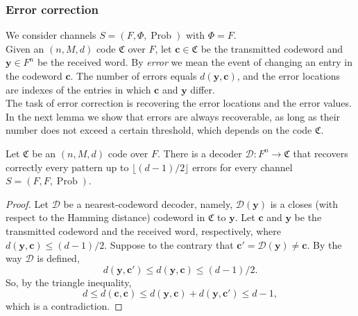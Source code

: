 \subsubsection{Error correction}
We consider channels $S=(F,\Phi,\operatorname{Prob})$ with $\Phi = F$.\\
\indent Given an $(n,M,d)$ code $\mathfrak{C}$ over $F$, let $\mathbf{c}\in\mathfrak{C}$ be the transmitted codeword and $\mathbf{y}\in F^n$ be the received word. By \textit{error} we mean the event of changing an entry in the codeword $\mathbf{c}$. The number of errors equals $d(\mathbf{y},\mathbf{c})$, and the error locations are indexes of the entries in which $\mathbf{c}$ and $\mathbf{y}$ differ.\\
\indent The task of error correction is recovering the error locations and the error values. In the next lemma we show that errors are always recoverable, as long as their number does not exceed a certain threshold, which depends on the code $\mathfrak{C}$.
\begin{lemma}
Let $\mathfrak{C}$ be an $(n,M,d)$ code over $F$. There is a decoder $\mathcal{D}: F^n \to \mathfrak{C}$ that recovers correctly every pattern up to $\lfloor(d-1)/2\rfloor$ errors for every channel $S=(F,F,\operatorname{Prob})$.
\end{lemma}
\begin{proof}
Let $\mathcal{D}$ be a nearest-codeword decoder, namely, $\mathcal{D}(\mathbf{y})$ is a closes (with respect to the Hamming distance) codeword in $\mathfrak{C}$ to $\mathbf{y}$. Let $\mathbf{c}$ and $\mathbf{y}$ be the transmitted codeword and the received word, respectively, where $d(\mathbf{y}, \mathbf{c})\leq (d-1)/2$. Suppose to the contrary that $\mathbf{c}' = \mathcal{D}(\mathbf{y})\neq\mathbf{c}$. By the way $\mathcal{D}$ is defined,
\begin{equation}
d(\mathbf{y}, \mathbf{c}')\leq d(\mathbf{y}, \mathbf{c}) \leq (d-1)/2 . 
\end{equation}
So, by the triangle inequality,
\begin{equation}
d\leq d(\mathbf{c}, \mathbf{c}) \leq d(\mathbf{y}, \mathbf{c}) + d(\mathbf{y}, \mathbf{c}') \leq d-1, 
\end{equation}
which is a contradiction.
\end{proof}
